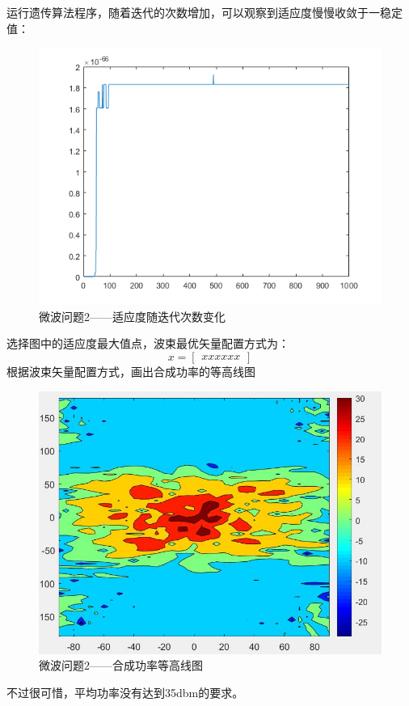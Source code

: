 \documentclass[UTF8,12pt]{ctexart}
\begin{document}
        运行遗传算法程序，随着迭代的次数增加，可以观察到适应度慢慢收敛于一稳定值：
        \begin{figure}[H]
            \centering
            \includegraphics[scale=0.8]{lian2.png}
            \caption{微波问题2——适应度随迭代次数变化}
            \end{figure}
        选择图中的适应度最大值点，波束最优矢量配置方式为：
            $$x = \begin{bmatrix}xxxxxx\end{bmatrix}$$ 
        根据波束矢量配置方式，画出合成功率的等高线图
            \begin{figure}[H]
          \centering
          \includegraphics[scale=0.6]{h2.jpg}
          \caption{微波问题2——合成功率等高线图}
          \end{figure} 
        不过很可惜，平均功率没有达到35dbm的要求。
    
\end{document}
